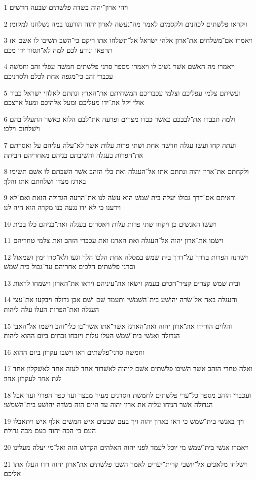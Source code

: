 \par 1 ויהי ארון־יהוה בשׂדה פלשׁתים שׁבעה חדשׁים׃
\par 2 ויקראו פלשׁתים לכהנים ולקסמים לאמר מה־נעשׂה לארון יהוה הודענו במה נשׁלחנו למקומו׃
\par 3 ויאמרו אם־משׁלחים את־ארון אלהי ישׂראל אל־תשׁלחו אתו ריקם כי־השׁב תשׁיבו לו אשׁם אז תרפאו ונודע לכם למה לא־תסור ידו מכם׃
\par 4 ויאמרו מה האשׁם אשׁר נשׁיב לו ויאמרו מספר סרני פלשׁתים חמשׁה עפלי זהב וחמשׁה עכברי זהב כי־מגפה אחת לכלם ולסרניכם׃
\par 5 ועשׂיתם צלמי עפליכם וצלמי עכבריכם המשׁחיתם את־הארץ ונתתם לאלהי ישׂראל כבוד אולי יקל את־ידו מעליכם ומעל אלהיכם ומעל ארצכם׃
\par 6 ולמה תכבדו את־לבבכם כאשׁר כבדו מצרים ופרעה את־לבם הלוא כאשׁר התעלל בהם וישׁלחום וילכו׃
\par 7 ועתה קחו ועשׂו עגלה חדשׁה אחת ושׁתי פרות עלות אשׁר לא־עלה עליהם על ואסרתם את־הפרות בעגלה והשׁיבתם בניהם מאחריהם הביתה׃
\par 8 ולקחתם את־ארון יהוה ונתתם אתו אל־העגלה ואת כלי הזהב אשׁר השׁבתם לו אשׁם תשׂימו בארגז מצדו ושׁלחתם אתו והלך׃
\par 9 וראיתם אם־דרך גבולו יעלה בית שׁמשׁ הוא עשׂה לנו את־הרעה הגדולה הזאת ואם־לא וידענו כי לא ידו נגעה בנו מקרה הוא היה לנו׃
\par 10 ויעשׂו האנשׁים כן ויקחו שׁתי פרות עלות ויאסרום בעגלה ואת־בניהם כלו בבית׃
\par 11 וישׂמו את־ארון יהוה אל־העגלה ואת הארגז ואת עכברי הזהב ואת צלמי טחריהם׃
\par 12 וישׁרנה הפרות בדרך על־דרך בית שׁמשׁ במסלה אחת הלכו הלך וגעו ולא־סרו ימין ושׂמאול וסרני פלשׁתים הלכים אחריהם עד־גבול בית שׁמשׁ׃
\par 13 ובית שׁמשׁ קצרים קציר־חטים בעמק וישׂאו את־עיניהם ויראו את־הארון וישׂמחו לראות׃
\par 14 והעגלה באה אל־שׂדה יהושׁע בית־השׁמשׁי ותעמד שׁם ושׁם אבן גדולה ויבקעו את־עצי העגלה ואת־הפרות העלו עלה ליהוה׃
\par 15 והלוים הורידו את־ארון יהוה ואת־הארגז אשׁר־אתו אשׁר־בו כלי־זהב וישׂמו אל־האבן הגדולה ואנשׁי בית־שׁמשׁ העלו עלות ויזבחו זבחים ביום ההוא ליהוה׃
\par 16 וחמשׁה סרני־פלשׁתים ראו וישׁבו עקרון ביום ההוא׃
\par 17 ואלה טחרי הזהב אשׁר השׁיבו פלשׁתים אשׁם ליהוה לאשׁדוד אחד לעזה אחד לאשׁקלון אחד לגת אחד לעקרון אחד׃
\par 18 ועכברי הזהב מספר כל־ערי פלשׁתים לחמשׁת הסרנים מעיר מבצר ועד כפר הפרזי ועד אבל הגדולה אשׁר הניחו עליה את ארון יהוה עד היום הזה בשׂדה יהושׁע בית־השׁמשׁי׃
\par 19 ויך באנשׁי בית־שׁמשׁ כי ראו בארון יהוה ויך בעם שׁבעים אישׁ חמשׁים אלף אישׁ ויתאבלו העם כי־הכה יהוה בעם מכה גדולה׃
\par 20 ויאמרו אנשׁי בית־שׁמשׁ מי יוכל לעמד לפני יהוה האלהים הקדושׁ הזה ואל־מי יעלה מעלינו׃
\par 21 וישׁלחו מלאכים אל־יושׁבי קרית־יערים לאמר השׁבו פלשׁתים את־ארון יהוה רדו העלו אתו אליכם׃

